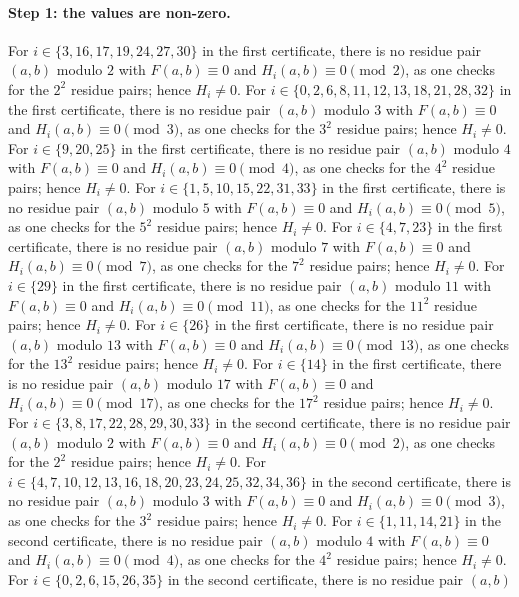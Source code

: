 \documentclass[11pt]{article}
\begin{document}
\paragraph{Step 1: the values are non-zero.} For $i\in\{3,\allowbreak 16,\allowbreak 17,\allowbreak 19,\allowbreak 24,\allowbreak 27,\allowbreak 30\}$ in the first certificate, there is no residue pair $(a,b)$ modulo $2$ with $F(a,b)\equiv0$ and $H_i(a,b)\equiv0\pmod{2}$, as one checks for the $2^2$ residue pairs; hence $H_i\neq0$. For $i\in\{0,\allowbreak 2,\allowbreak 6,\allowbreak 8,\allowbreak 11,\allowbreak 12,\allowbreak 13,\allowbreak 18,\allowbreak 21,\allowbreak 28,\allowbreak 32\}$ in the first certificate, there is no residue pair $(a,b)$ modulo $3$ with $F(a,b)\equiv0$ and $H_i(a,b)\equiv0\pmod{3}$, as one checks for the $3^2$ residue pairs; hence $H_i\neq0$. For $i\in\{9,\allowbreak 20,\allowbreak 25\}$ in the first certificate, there is no residue pair $(a,b)$ modulo $4$ with $F(a,b)\equiv0$ and $H_i(a,b)\equiv0\pmod{4}$, as one checks for the $4^2$ residue pairs; hence $H_i\neq0$. For $i\in\{1,\allowbreak 5,\allowbreak 10,\allowbreak 15,\allowbreak 22,\allowbreak 31,\allowbreak 33\}$ in the first certificate, there is no residue pair $(a,b)$ modulo $5$ with $F(a,b)\equiv0$ and $H_i(a,b)\equiv0\pmod{5}$, as one checks for the $5^2$ residue pairs; hence $H_i\neq0$. For $i\in\{4,\allowbreak 7,\allowbreak 23\}$ in the first certificate, there is no residue pair $(a,b)$ modulo $7$ with $F(a,b)\equiv0$ and $H_i(a,b)\equiv0\pmod{7}$, as one checks for the $7^2$ residue pairs; hence $H_i\neq0$. For $i\in\{29\}$ in the first certificate, there is no residue pair $(a,b)$ modulo $11$ with $F(a,b)\equiv0$ and $H_i(a,b)\equiv0\pmod{11}$, as one checks for the $11^2$ residue pairs; hence $H_i\neq0$. For $i\in\{26\}$ in the first certificate, there is no residue pair $(a,b)$ modulo $13$ with $F(a,b)\equiv0$ and $H_i(a,b)\equiv0\pmod{13}$, as one checks for the $13^2$ residue pairs; hence $H_i\neq0$. For $i\in\{14\}$ in the first certificate, there is no residue pair $(a,b)$ modulo $17$ with $F(a,b)\equiv0$ and $H_i(a,b)\equiv0\pmod{17}$, as one checks for the $17^2$ residue pairs; hence $H_i\neq0$. For $i\in\{3,\allowbreak 8,\allowbreak 17,\allowbreak 22,\allowbreak 28,\allowbreak 29,\allowbreak 30,\allowbreak 33\}$ in the second certificate, there is no residue pair $(a,b)$ modulo $2$ with $F(a,b)\equiv0$ and $H_i(a,b)\equiv0\pmod{2}$, as one checks for the $2^2$ residue pairs; hence $H_i\neq0$. For $i\in\{4,\allowbreak 7,\allowbreak 10,\allowbreak 12,\allowbreak 13,\allowbreak 16,\allowbreak 18,\allowbreak 20,\allowbreak 23,\allowbreak 24,\allowbreak 25,\allowbreak 32,\allowbreak 34,\allowbreak 36\}$ in the second certificate, there is no residue pair $(a,b)$ modulo $3$ with $F(a,b)\equiv0$ and $H_i(a,b)\equiv0\pmod{3}$, as one checks for the $3^2$ residue pairs; hence $H_i\neq0$. For $i\in\{1,\allowbreak 11,\allowbreak 14,\allowbreak 21\}$ in the second certificate, there is no residue pair $(a,b)$ modulo $4$ with $F(a,b)\equiv0$ and $H_i(a,b)\equiv0\pmod{4}$, as one checks for the $4^2$ residue pairs; hence $H_i\neq0$. For $i\in\{0,\allowbreak 2,\allowbreak 6,\allowbreak 15,\allowbreak 26,\allowbreak 35\}$ in the second certificate, there is no residue pair $(a,b)$ 
\end{document}
